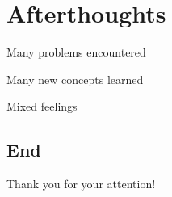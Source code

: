 \documentclass[
	xcolor=dvipsnames,
	handout
]{beamer}
\newenvironment{zhawframe}[1][]
{\begin{frame}[environment=fr,#1]{\insertsubsectionhead}{\insertsectionhead}}
{\end{frame}
}
\begin{document}
\section{Afterthoughts}
\begin{zhawframe}
 Many problems encountered

 Many new concepts learned

 Mixed feelings
\end{zhawframe}

\subsection{End}
\begin{zhawframe}
Thank you for your attention!
\end{zhawframe}
\end{document}
